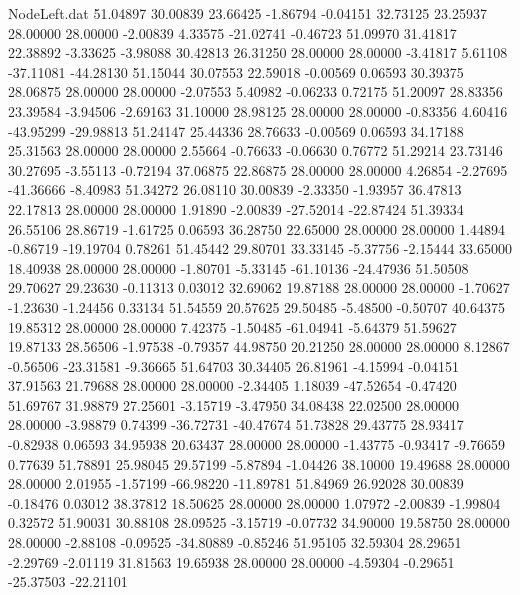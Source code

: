 \begin{filecontents}{NodeLeft.dat}
  51.04897   30.00839   23.66425    -1.86794   -0.04151   32.73125   23.25937   28.00000   28.00000   -2.00839    4.33575  -21.02741   -0.46723
  51.09970   31.41817   22.38892    -3.33625   -3.98088   30.42813   26.31250   28.00000   28.00000   -3.41817    5.61108  -37.11081  -44.28130
  51.15044   30.07553   22.59018    -0.00569    0.06593   30.39375   28.06875   28.00000   28.00000   -2.07553    5.40982   -0.06233    0.72175
  51.20097   28.83356   23.39584    -3.94506   -2.69163   31.10000   28.98125   28.00000   28.00000   -0.83356    4.60416  -43.95299  -29.98813
  51.24147   25.44336   28.76633    -0.00569    0.06593   34.17188   25.31563   28.00000   28.00000    2.55664   -0.76633   -0.06630    0.76772
  51.29214   23.73146   30.27695    -3.55113   -0.72194   37.06875   22.86875   28.00000   28.00000    4.26854   -2.27695  -41.36666   -8.40983
  51.34272   26.08110   30.00839    -2.33350   -1.93957   36.47813   22.17813   28.00000   28.00000    1.91890   -2.00839  -27.52014  -22.87424
  51.39334   26.55106   28.86719    -1.61725    0.06593   36.28750   22.65000   28.00000   28.00000    1.44894   -0.86719  -19.19704    0.78261
  51.45442   29.80701   33.33145    -5.37756   -2.15444   33.65000   18.40938   28.00000   28.00000   -1.80701   -5.33145  -61.10136  -24.47936
  51.50508   29.70627   29.23630    -0.11313    0.03012   32.69062   19.87188   28.00000   28.00000   -1.70627   -1.23630   -1.24456    0.33134
  51.54559   20.57625   29.50485    -5.48500   -0.50707   40.64375   19.85312   28.00000   28.00000    7.42375   -1.50485  -61.04941   -5.64379
  51.59627   19.87133   28.56506    -1.97538   -0.79357   44.98750   20.21250   28.00000   28.00000    8.12867   -0.56506  -23.31581   -9.36665
  51.64703   30.34405   26.81961    -4.15994   -0.04151   37.91563   21.79688   28.00000   28.00000   -2.34405    1.18039  -47.52654   -0.47420
  51.69767   31.98879   27.25601    -3.15719   -3.47950   34.08438   22.02500   28.00000   28.00000   -3.98879    0.74399  -36.72731  -40.47674
  51.73828   29.43775   28.93417    -0.82938    0.06593   34.95938   20.63437   28.00000   28.00000   -1.43775   -0.93417   -9.76659    0.77639
  51.78891   25.98045   29.57199    -5.87894   -1.04426   38.10000   19.49688   28.00000   28.00000    2.01955   -1.57199  -66.98220  -11.89781
  51.84969   26.92028   30.00839    -0.18476    0.03012   38.37812   18.50625   28.00000   28.00000    1.07972   -2.00839   -1.99804    0.32572
  51.90031   30.88108   28.09525    -3.15719   -0.07732   34.90000   19.58750   28.00000   28.00000   -2.88108   -0.09525  -34.80889   -0.85246
  51.95105   32.59304   28.29651    -2.29769   -2.01119   31.81563   19.65938   28.00000   28.00000   -4.59304   -0.29651  -25.37503  -22.21101

\end{filecontents}
